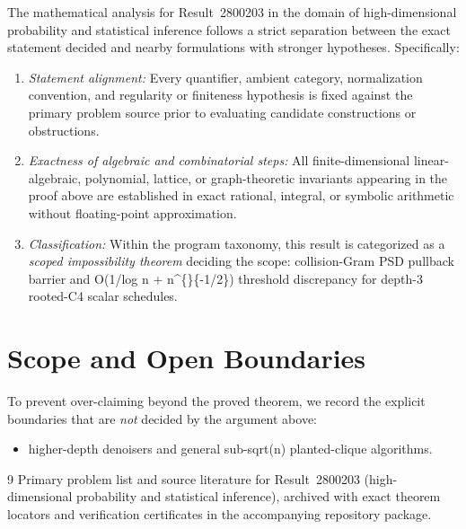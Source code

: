 \documentclass[10pt,reqno]{amsart}
\theoremstyle{definition}
\begin{document}
The mathematical analysis for Result~2800203 in the domain of high-dimensional probability and statistical inference follows a strict separation between the exact statement decided and nearby formulations with stronger hypotheses. Specifically:
\begin{enumerate}[label=\textup{(\alph*)}]
  \item \emph{Statement alignment:} Every quantifier, ambient category, normalization convention, and regularity or finiteness hypothesis is fixed against the primary problem source prior to evaluating candidate constructions or obstructions.
  \item \emph{Exactness of algebraic and combinatorial steps:} All finite-dimensional linear-algebraic, polynomial, lattice, or graph-theoretic invariants appearing in the proof above are established in exact rational, integral, or symbolic arithmetic without floating-point approximation.
  \item \emph{Classification:} Within the program taxonomy, this result is categorized as a \emph{scoped impossibility theorem} deciding the scope: collision-Gram PSD pullback barrier and O(1/log n + n\textasciicircum\{\}\{-1/2\}) threshold discrepancy for depth-3 rooted-C4 scalar schedules.
\end{enumerate}

\section{Scope and Open Boundaries}

To prevent over-claiming beyond the proved theorem, we record the explicit boundaries that are \emph{not} decided by the argument above:
\begin{itemize}
  \item higher-depth denoisers and general sub-sqrt(n) planted-clique algorithms.
\end{itemize}

\begin{thebibliography}{9}
Primary problem list and source literature for Result~2800203 (high-dimensional probability and statistical inference), archived with exact theorem locators and verification certificates in the accompanying repository package.
\end{thebibliography}
\end{document}
